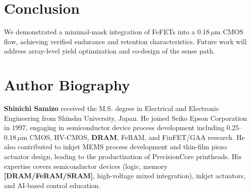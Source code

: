 \documentclass[journal]{IEEEtran}
\begin{document}
\section{Conclusion}
We demonstrated a minimal-mask integration of FeFETs into a 0.18\,$\mu$m CMOS flow, achieving verified endurance and retention characteristics. Future work will address array-level yield optimization and co-design of the sense path.




\section*{Author Biography}
\textbf{Shinichi Samizo} received the M.S. degree in Electrical and Electronic Engineering from Shinshu University, Japan. He joined Seiko Epson Corporation in 1997, engaging in semiconductor device process development including 0.25–0.18\,$\mu$m CMOS, HV-CMOS, \textbf{DRAM}, FeRAM, and FinFET/GAA research. He also contributed to inkjet MEMS process development and thin-film piezo actuator design, leading to the productization of PrecisionCore printheads. His expertise covers semiconductor devices (logic, memory \textbf{[DRAM/FeRAM/SRAM]}, high-voltage mixed integration), inkjet actuators, and AI-based control education.
\end{document}
